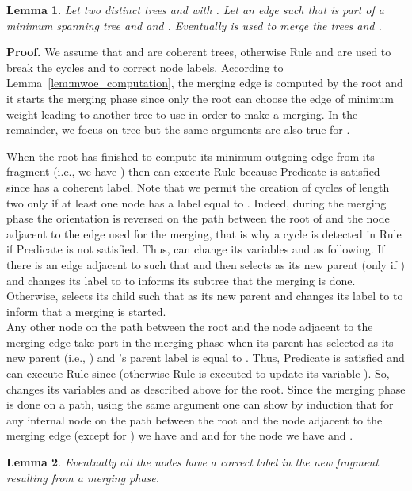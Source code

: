 \documentclass[11pt,a4paper]{article}
\newtheorem{lemma}{Lemma}
\newenvironment{proof}{\noindent \begin{rm}{\textbf{Proof.} }}{\hspace*{\fill}\par\end{rm}}
\begin{document}
\begin{lemma}
\label{lem:merging_start}
Let two distinct trees  and  with . Let an edge  such that  is part of a minimum spanning tree and  and . Eventually  is used to merge the trees  and .
\end{lemma}

\begin{proof}
We assume that  and  are coherent trees, otherwise Rule  and  are used to break the cycles and to correct node labels. According to Lemma~\ref{lem:mwoe_computation}, the merging edge  is computed by the root and it starts the merging phase since only the root can choose the edge of minimum weight leading to another tree to use in order to make a merging. In the remainder, we focus on tree  but the same arguments are also true for .

When the root  has finished to compute its minimum outgoing edge from its fragment (i.e., we have ) then  can execute Rule  because Predicate  is satisfied since  has a coherent label. Note that we permit the creation of cycles of length two only if at least one node has a label equal to . Indeed, during the merging phase the orientation is reversed on the path between the root of  and the node adjacent to the edge used for the merging, that is why a cycle is detected in Rule  if Predicate  is not satisfied. Thus,  can change its variables  and  as following. If there is an edge  adjacent to  such that  and  then  selects  as its new parent (only if ) and  changes its label to  to informs its subtree that the merging is done. Otherwise,  selects its child  such that  as its new parent and  changes its label to  to inform  that a merging is started.\\
Any other node  on the path between the root and the node adjacent to the merging edge take part in the merging phase when its parent has selected  as its new parent (i.e., ) and 's parent label is equal to . Thus, Predicate  is satisfied and  can execute Rule  since  (otherwise Rule  is executed to update its variable ). So,  changes its variables  and  as described above for the root. Since the merging phase is done on a path, using the same argument one can show by induction that for any internal node  on the path between the root and the node  adjacent to the merging edge (except for ) we have  and  and for the node  we have  and .
\end{proof}

\begin{lemma}
\label{lem:merging_end}
Eventually all the nodes have a correct label in the new fragment resulting from a merging phase.
\end{lemma}
\end{document}
